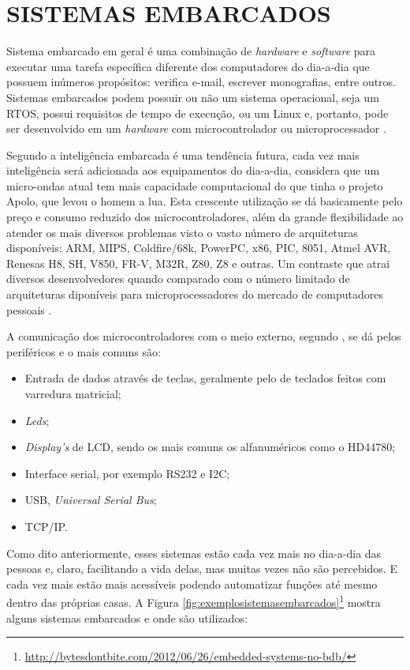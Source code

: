\chapter{SISTEMAS EMBARCADOS}
Sistema embarcado em geral é uma combinação de \emph{hardware} e \emph{software} para executar uma tarefa específica diferente dos computadores do dia-a-dia que possuem inúmeros propósitos: verifica e-mail, escrever monografias, entre outros. Sistemas embarcados podem possuir ou não um sistema operacional, seja um RTOS, possui requisitos de tempo de execução, ou um Linux e, portanto, pode ser desenvolvido em um \emph{hardware} com microcontrolador ou microprocessador \cite{wikibook2012embedded}.

Segundo \cite{cunha2013} a inteligência embarcada é uma tendência futura, cada vez mais inteligência será adicionada aos equipamentos do dia-a-dia, considera que um micro-ondas atual tem mais capacidade computacional do que tinha o projeto Apolo, que levou o homem a lua. Esta crescente utilização se dá basicamente pelo preço e consumo reduzido dos microcontroladores, além da grande flexibilidade ao atender os mais diversos problemas visto o vasto número de arquiteturas disponíveis: ARM, MIPS, Coldfire/68k, PowerPC, x86, PIC, 8051, Atmel AVR, Renesas H8, SH, V850, FR-V, M32R, Z80, Z8 e outras. Um contraste que atrai diversos desenvolvedores quando comparado com o número limitado de arquiteturas diponíveis para microprocessadores do mercado de computadores pessoais \cite{germano2011}.

A comunicação dos microcontroladores com o meio externo, segundo \cite{germano2011}, se dá pelos periféricos e o mais comuns são:
\begin{itemize}
\item Entrada de dados através de teclas, geralmente pelo de teclados feitos com varredura matricial;
\item \emph{Leds};
\item \emph{Display’s} de LCD, sendo os mais comuns os alfanuméricos como o HD44780;
\item Interface serial, por exemplo RS232 e I2C;
\item USB, \emph{Universal Serial Bus};
\item TCP/IP.
\end{itemize}

Como dito anteriormente, esses sistemas estão cada vez mais no dia-a-dia das pessoas e, claro, facilitando a vida delas, mas muitas vezes não são percebidos. E cada vez mais estão mais acessíveis podendo automatizar funções até mesmo dentro das próprias casas. A Figura \ref{fig:exemplosistemasembarcados}\footnote{\url{http://bytesdontbite.com/2012/06/26/embedded-systems-no-bdb/}} mostra alguns sistemas embarcados e onde são utilizados:

